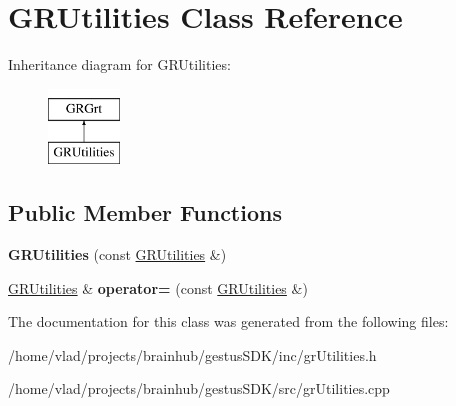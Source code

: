 \hypertarget{classGRUtilities}{}\section{G\+R\+Utilities Class Reference}
\label{classGRUtilities}
Inheritance diagram for G\+R\+Utilities\+:\begin{figure}[H]
\begin{center}
\leavevmode
\includegraphics[height=2.000000cm]{classGRUtilities}
\end{center}
\end{figure}
\subsection*{Public Member Functions}
\begin{DoxyCompactItemize}
\item 
\mbox{\label{classGRUtilities_a0d5634b33b4356e446d2ab1ef7a3f749}} 
{\bfseries G\+R\+Utilities} (const \mbox{\hyperlink{classGRUtilities}{G\+R\+Utilities}} \&)
\item 
\mbox{\label{classGRUtilities_ae5e0c51275ce73d749b27999051c9749}} 
\mbox{\hyperlink{classGRUtilities}{G\+R\+Utilities}} \& {\bfseries operator=} (const \mbox{\hyperlink{classGRUtilities}{G\+R\+Utilities}} \&)
\end{DoxyCompactItemize}


The documentation for this class was generated from the following files\+:\begin{DoxyCompactItemize}
\item 
/home/vlad/projects/brainhub/gestus\+S\+D\+K/inc/gr\+Utilities.\+h\item 
/home/vlad/projects/brainhub/gestus\+S\+D\+K/src/gr\+Utilities.\+cpp\end{DoxyCompactItemize}
